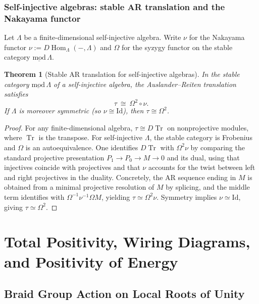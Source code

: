 \documentclass[11pt,oneside]{amsbook}
\numberwithin{equation}{section}
\theoremstyle{plain}
\newtheorem{theorem}{Theorem}[section]
\theoremstyle{definition}
\theoremstyle{remark}
\newenvironment{marginfigure}{\begin{figure}[htbp]\centering}{\end{figure}}
\DeclareMathOperator{\Hom}{\mathrm{Hom}}
\DeclareMathOperator{\Tr}{\mathrm{Tr}}
\begin{document}
\section{Self-injective algebras: stable AR translation and the Nakayama functor}
\label{sec:selfinjective_tau}

Let $\Lambda$ be a finite-dimensional self-injective algebra. Write $\nu$ for the Nakayama functor
$\nu := D\Hom_\Lambda(-,\Lambda)$ and $\Omega$ for the syzygy functor on the stable category $\underline{\mathrm{mod}}\,\Lambda$.

\begin{theorem}[Stable AR translation for self-injective algebras]
\label{thm:tau_selfinjective}
In the stable category $\underline{\mathrm{mod}}\,\Lambda$ of a self-injective algebra, the Auslander--Reiten translation satisfies
\[
\tau \ \cong\ \Omega^2\circ \nu.
\]
If $\Lambda$ is moreover symmetric (so $\nu\cong \mathrm{Id}$), then $\tau \cong \Omega^2$.
\end{theorem}

\begin{proof}
For any finite-dimensional algebra, $\tau \cong D\Tr$ on nonprojective modules, where $\Tr$ is the transpose.
For self-injective $\Lambda$, the stable category is Frobenius and $\Omega$ is an autoequivalence.
One identifies $D\Tr$ with $\Omega^2\nu$ by comparing the standard projective presentation
$P_1\to P_0\to M\to 0$ and its dual, using that injectives coincide with projectives and that $\nu$ accounts for the
twist between left and right projectives in the duality. Concretely, the AR sequence ending in $M$ is obtained from a
minimal projective resolution of $M$ by splicing, and the middle term identifies with $\Omega^{-1}\nu^{-1}\Omega M$,
yielding $\tau\simeq \Omega^2\nu$. Symmetry implies $\nu\simeq \mathrm{Id}$, giving $\tau\simeq\Omega^2$.
\end{proof}



\part{Total Positivity, Wiring Diagrams, and Positivity of Energy}

					\chapter{Braid Group Action on Local Roots of Unity}
					
					\begin{marginfigure}%
					\end{marginfigure}
					
\end{document}
